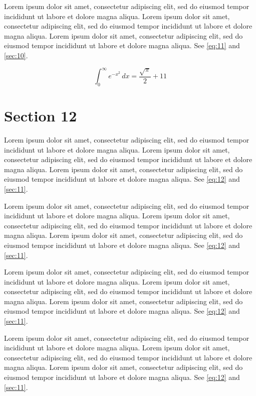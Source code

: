 \documentclass[11pt]{article}
\begin{document}
Lorem ipsum dolor sit amet, consectetur adipiscing elit, sed do eiusmod tempor incididunt ut labore et dolore magna aliqua. Lorem ipsum dolor sit amet, consectetur adipiscing elit, sed do eiusmod tempor incididunt ut labore et dolore magna aliqua. Lorem ipsum dolor sit amet, consectetur adipiscing elit, sed do eiusmod tempor incididunt ut labore et dolore magna aliqua. See \cref{eq:11} and \cref{sec:10}.

\begin{equation}\label{eq:11} \int_0^\infty e^{-x^2}\,dx = \frac{\sqrt{\pi}}{2} + 11\end{equation}
\section{Section 12}\label{sec:12}
Lorem ipsum dolor sit amet, consectetur adipiscing elit, sed do eiusmod tempor incididunt ut labore et dolore magna aliqua. Lorem ipsum dolor sit amet, consectetur adipiscing elit, sed do eiusmod tempor incididunt ut labore et dolore magna aliqua. Lorem ipsum dolor sit amet, consectetur adipiscing elit, sed do eiusmod tempor incididunt ut labore et dolore magna aliqua. See \cref{eq:12} and \cref{sec:11}.

Lorem ipsum dolor sit amet, consectetur adipiscing elit, sed do eiusmod tempor incididunt ut labore et dolore magna aliqua. Lorem ipsum dolor sit amet, consectetur adipiscing elit, sed do eiusmod tempor incididunt ut labore et dolore magna aliqua. Lorem ipsum dolor sit amet, consectetur adipiscing elit, sed do eiusmod tempor incididunt ut labore et dolore magna aliqua. See \cref{eq:12} and \cref{sec:11}.

Lorem ipsum dolor sit amet, consectetur adipiscing elit, sed do eiusmod tempor incididunt ut labore et dolore magna aliqua. Lorem ipsum dolor sit amet, consectetur adipiscing elit, sed do eiusmod tempor incididunt ut labore et dolore magna aliqua. Lorem ipsum dolor sit amet, consectetur adipiscing elit, sed do eiusmod tempor incididunt ut labore et dolore magna aliqua. See \cref{eq:12} and \cref{sec:11}.

Lorem ipsum dolor sit amet, consectetur adipiscing elit, sed do eiusmod tempor incididunt ut labore et dolore magna aliqua. Lorem ipsum dolor sit amet, consectetur adipiscing elit, sed do eiusmod tempor incididunt ut labore et dolore magna aliqua. Lorem ipsum dolor sit amet, consectetur adipiscing elit, sed do eiusmod tempor incididunt ut labore et dolore magna aliqua. See \cref{eq:12} and \cref{sec:11}.
\end{document}
